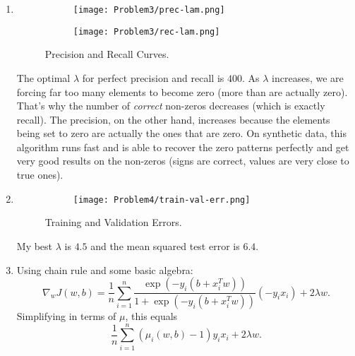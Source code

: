 \documentclass[11pt]{article}
\numberwithin{equation}{enumi}
\begin{document}
\begin{enumerate}
	\item 
 \begin{figure}[h!]
  \centering
  \begin{subfigure}[b]{0.32\linewidth}
    \texttt{[image: Problem3/prec-lam.png]}
  \end{subfigure}
  \begin{subfigure}[b]{0.32\linewidth}
    \texttt{[image: Problem3/rec-lam.png]}
  \end{subfigure}
  \caption{Precision and Recall Curves.}
  \label{datasets}
\end{figure}
	The optimal $\lambda$ for perfect precision and recall is $400$. As $\lambda$ increases, we are forcing far too many elements to become zero (more than are actually zero). That's why the number of \emph{correct} non-zeros decreases (which is exactly recall). The precision, on the other hand, increases because the elements being set to zero are actually the ones that are zero. On synthetic data, this algorithm runs fast and is able to recover the zero patterns perfectly and get very good results on the non-zeros (signs are correct, values are very close to true ones). 
		
		\item 
\begin{figure}[h!]
  \centering
  \begin{subfigure}[b]{0.5\linewidth}
    \texttt{[image: Problem4/train-val-err.png]}
  \end{subfigure}
  \caption{Training and Validation Errors.}
  \label{datasets}
\end{figure}

	My best $\lambda$ is $4.5$ and the mean squared test error is $6.4$. 
	

	\item Using chain rule and some basic algebra: 
	\[ \nabla_w J(w, b) = \frac{1}{n} \sum_{i = 1}^n \frac{\exp(- y_i (b+ x_i^T w))}{1 + \exp(-y_i(b+x_i^T w))} (-y_i x_i) + 2\lambda w.\] Simplifying in terms of $\mu$, this equals \[ \frac{1}{n}\sum_{i = 1}^n (\mu_i(w, b) -1) y_i x_i + 2\lambda w.\] 
		
\end{enumerate}
\newpage
\nocite{*}
\end{document}
